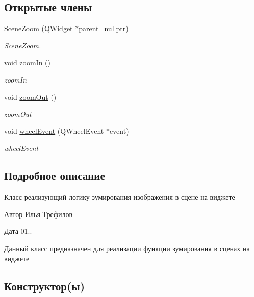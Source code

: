 \subsection*{Открытые члены}
\begin{DoxyCompactItemize}
\item 
\hyperlink{classSceneZoom_a4467d1e53eb8d2af1866f25759b0dbcd}{Scene\+Zoom} (Q\+Widget $\ast$parent=nullptr)
\begin{DoxyCompactList}\small\item\em \hyperlink{classSceneZoom}{Scene\+Zoom}. \end{DoxyCompactList}\item 
void \hyperlink{classSceneZoom_a7d535a62dbc00e43b7daabaf6a61f553}{zoom\+In} ()
\begin{DoxyCompactList}\small\item\em zoom\+In \end{DoxyCompactList}\item 
void \hyperlink{classSceneZoom_a9907761406dc1a9f1664429b4004a592}{zoom\+Out} ()
\begin{DoxyCompactList}\small\item\em zoom\+Out \end{DoxyCompactList}\item 
void \hyperlink{classSceneZoom_a6ef95f5202dcc08251417074fbcf14b7}{wheel\+Event} (Q\+Wheel\+Event $\ast$event)
\begin{DoxyCompactList}\small\item\em wheel\+Event \end{DoxyCompactList}\end{DoxyCompactItemize}


\subsection{Подробное описание}
Класс реализующий логику зумирования изображения в сцене на виджете 

\begin{DoxyAuthor}{Автор}
Илья Трефилов 
\end{DoxyAuthor}
\begin{DoxyDate}{Дата}
01..
\end{DoxyDate}
Данный класс предназначен для реализации функции зумирования в сценах на виджете 

\subsection{Конструктор(ы)}
\mbox{\label{classSceneZoom_a4467d1e53eb8d2af1866f25759b0dbcd}} 
